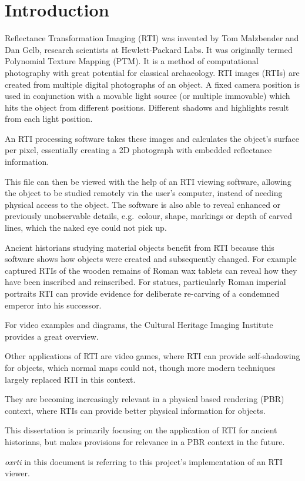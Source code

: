 \section{Introduction}
Reflectance Transformation Imaging (RTI) was  invented by Tom Malzbender and Dan
Gelb, research scientists at Hewlett-Packard Labs. It was originally termed
Polynomial Texture Mapping (PTM). It is a method of computational photography
with great potential for classical archaeology. RTI images (RTIs) are created from
multiple digital photographs of an object. A fixed camera position is used in
conjunction with a movable light source (or multiple immovable) which hits the
object from different positions. Different shadows and highlights result from
each light position.

An RTI processing software takes these images and calculates the object's
surface per pixel, essentially creating a 2D photograph with embedded
reflectance information.

This file can then be viewed with the help of an RTI viewing software, allowing
the object to be studied remotely via the user's computer, instead of needing
physical access to the object. The software is also able to reveal enhanced or
previously unobservable details, e.g.\ colour, shape, markings or depth of
carved lines, which the naked eye could not pick up.

Ancient historians studying material objects benefit from RTI because this
software shows how objects were created and subsequently changed. For example
captured RTIs of the wooden remains of Roman wax tablets can reveal how they
have been inscribed and reinscribed. For statues, particularly Roman imperial
portraits RTI can provide evidence for deliberate re-carving of a condemned
emperor into his successor.

For video examples and diagrams, the Cultural Heritage Imaging Institute provides a great overview\cite*{noauthor_cultural_nodate}.

Other applications of RTI are video games, where RTI can provide self-shadowing
for objects, which normal maps could not, though more modern techniques largely
replaced RTI in this context.

They are becoming increasingly relevant in a physical based rendering (PBR) context,
where RTIs can provide better physical information for objects.

This dissertation is primarily focusing on the application of RTI for ancient
historians, but makes provisions for relevance in a PBR context in the future.

\emph{oxrti} in this document is referring to this project's implementation of an
RTI viewer.